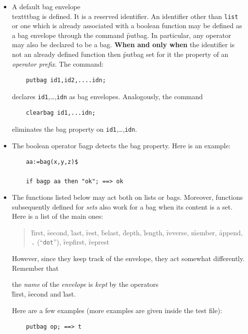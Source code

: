 \begin{itemize}
\item[i.] A default bag envelope \\texttt{bag} is defined.%
\hypertarget{reserved:BAG}{}
It is a reserved identifier.
%
%
%
\hypertarget{operator:PUTBAG}{}%
\hypertarget{operator:CLEARBAG}{}%
\hypertarget{operator:BAGP}{}%
An identifier other than \texttt{list} or one which is already associated
with a boolean function may be defined as a bag envelope through the
command \f{putbag}. In particular, any operator may also be declared
to be a bag. \textbf{When and only when} the identifier is not an already defined
function then \f{putbag} set for it the property of an \emph{operator prefix}.
The command:
\begin{verbatim}
    putbag id1,id2,....idn;
\end{verbatim}
declares \texttt{id1},\ldots,\texttt{idn} as bag envelopes.
Analogously, the command
\begin{verbatim}
    clearbag id1,...idn;
\end{verbatim}
eliminates the bag property on \texttt{id1},\ldots,\texttt{idn}.
\item[ii.] The boolean operator \f{bagp} detects the bag property.
Here is an example:
\begin{verbatim}
    aa:=bag(x,y,z)$

    if bagp aa then "ok"; ==> ok
\end{verbatim}
\item[iii.] The functions listed below may act both on lists or bags.
Moreover, functions subsequently defined for \emph{sets} also work for a bag
when its content is a set.
Here is a list of the main ones:

\begin{quote}\sloppy\raggedright
\f{first}, \f{second}, \f{last}, \f{rest}, \f{belast}, \f{depth}, \f{length}, \f{reverse},
\f{member}, \f{append}, \texttt{.} (``\texttt{dot}''), \f{repfirst}, \f{represt}
\end{quote}

However, since they keep track of the envelope, they act
somewhat differently. Remember that
\vspace{5pt}
\begin{center}
the \emph{name} of the \emph{envelope} is \emph{kept} by the operators \\[3pt]
\f{first}, \f{second} and \f{last}.
\end{center}
Here are a few examples (more examples are
given inside the test file):
\begin{verbatim}
    putbag op; ==> t


\end{verbatim}
\end{itemize}
